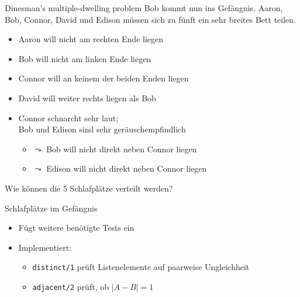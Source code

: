 \documentclass{beamer}
\begin{document}
\begin{frame}{Dinesman's multiple-dwelling problem}
	Bob kommt nun ins Gefängnis.
	Aaron, Bob, Connor, David und Edison müssen sich zu fünft ein sehr breites Bett teilen.

	\begin{itemize}
		\item Aaron will nicht am rechten Ende liegen
		\item Bob will nicht am linken Ende liegen
		\item Connor will an keinem der beiden Enden liegen
		\item David will weiter rechts liegen als Bob
		\item Connor schnarcht sehr laut;\\Bob und Edison sind sehr geräuschempfindlich
		\begin{itemize}
			\item $\leadsto$ Bob will nicht direkt neben Connor liegen
			\item $\leadsto$ Edison will nicht direkt neben Connor liegen
		\end{itemize}
	\end{itemize}

	Wie können die 5 Schlafplätze verteilt werden?
\end{frame}

\begin{frame}{Schlafplätze im Gefängnis}

	\begin{itemize}
		\item Fügt weitere benötigte Tests ein
		\item Implementiert:
		\begin{itemize}
			\item \texttt{distinct/1} prüft Listenelemente auf paarweise Ungleichheit
			\item \texttt{adjacent/2} prüft, ob $|A - B| = 1$
		\end{itemize}
	\end{itemize}
\end{frame}

\end{document}
